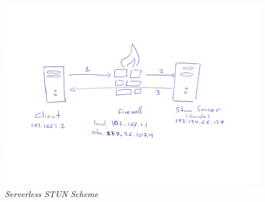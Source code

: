 \begin{figure}[htpb]
\centering
\begin{adjustbox}{center}
\includegraphics[scale=0.1]{annexes/schemes/stun-scheme.jpg}
\end{adjustbox}
\caption{\small \sl Serverless STUN Scheme
\label{fig:stun-scheme}}
\end{figure} 


